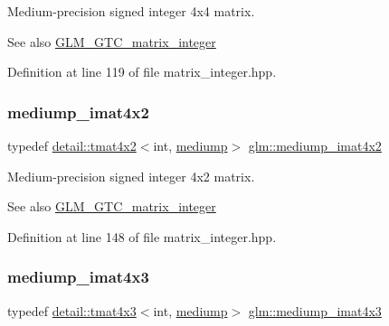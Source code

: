 Medium-\/precision signed integer 4x4 matrix. \begin{DoxySeeAlso}{See also}
\hyperlink{group__gtc__matrix__integer}{G\+L\+M\+\_\+\+G\+T\+C\+\_\+matrix\+\_\+integer} 
\end{DoxySeeAlso}


Definition at line 119 of file matrix\+\_\+integer.\+hpp.

\mbox{\label{group__gtc__matrix__integer_gacdae7d6ae4820756c62c2b5fd5c0370a}} 
\subsubsection{\texorpdfstring{mediump\+\_\+imat4x2}{mediump\_imat4x2}}
{\footnotesize\ttfamily typedef \hyperlink{structglm_1_1detail_1_1tmat4x2}{detail\+::tmat4x2}$<$int, \hyperlink{namespaceglm_a0f04f086094c747d227af4425893f545a6416f3ea0c9025fb21ed50c4d6620482}{mediump}$>$ \hyperlink{group__gtc__matrix__integer_gacdae7d6ae4820756c62c2b5fd5c0370a}{glm\+::mediump\+\_\+imat4x2}}

Medium-\/precision signed integer 4x2 matrix. \begin{DoxySeeAlso}{See also}
\hyperlink{group__gtc__matrix__integer}{G\+L\+M\+\_\+\+G\+T\+C\+\_\+matrix\+\_\+integer} 
\end{DoxySeeAlso}


Definition at line 148 of file matrix\+\_\+integer.\+hpp.

\mbox{\label{group__gtc__matrix__integer_ga5032ee978a55aa0db4842d5c3cbeade0}} 
\subsubsection{\texorpdfstring{mediump\+\_\+imat4x3}{mediump\_imat4x3}}
{\footnotesize\ttfamily typedef \hyperlink{structglm_1_1detail_1_1tmat4x3}{detail\+::tmat4x3}$<$int, \hyperlink{namespaceglm_a0f04f086094c747d227af4425893f545a6416f3ea0c9025fb21ed50c4d6620482}{mediump}$>$ \hyperlink{group__gtc__matrix__integer_ga5032ee978a55aa0db4842d5c3cbeade0}{glm\+::mediump\+\_\+imat4x3}}

